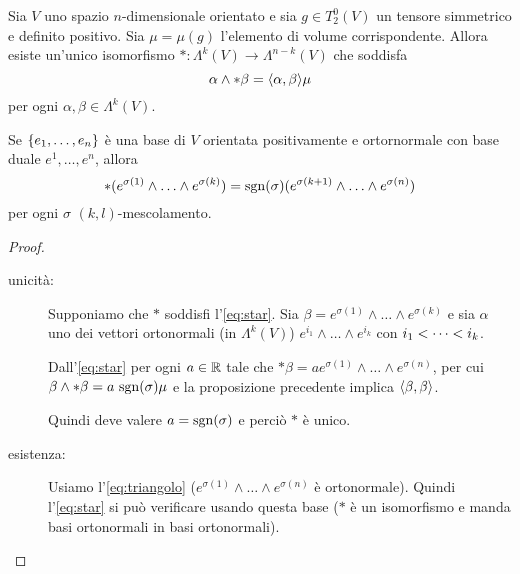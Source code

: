 \begin{proposition}
	Sia $V$ uno spazio $n$-dimensionale orientato e sia $g\in T^0_2(V)$ un tensore simmetrico e definito positivo.
	Sia $\mu=\mu(g)$ l'elemento di volume corrispondente.
	Allora esiste un'unico isomorfismo $*:\Lambda^k(V) \to \Lambda^{n-k}(V)$ che soddisfa
	\begin{equation} \label{eq:star}
	\alpha \wedge * \beta = \Scal \alpha\beta \mu
	\end{equation}
	per ogni $\alpha,\beta \in\Lambda^k(V)$.
	
	Se $\{\seqb en, \}$ è una base di $V$ orientata positivamente e ortornormale con base duale $e^1, \dots ,e^n$, allora
	\begin{equation}\label{eq:triangolo}
	*(e^{\sigma(1)}\wedge\ldots\wedge e^{\sigma(k)}) = \sgn(\sigma) (e^{\sigma(k+1)}\wedge\ldots\wedge e^{\sigma(n)})
	\end{equation}
	per ogni $\sigma$ $(k,l)$-mescolamento.
\end{proposition}
\begin{proof}
	\begin{description}
		\item [unicità:] Supponiamo che $*$ soddisfi l'\cref{eq:star}. Sia $\beta = e^{\sigma(1)} \wedge\ldots\wedge e^{\sigma(k)}$ e sia $\alpha$ uno dei vettori ortonormali (in $\Lambda^k(V)$) $e^{i_1}\wedge\ldots\wedge e^{i_k}$ con $\seqb ik<$.
		
		Dall'\cref{eq:star} per ogni $a\in\R$ tale che $*\beta = a e^{\sigma(1)} \wedge\ldots\wedge e^{\sigma(n)}$, per cui $\beta\wedge * \beta = a\ \sgn(\sigma) \mu$ e la proposizione precedente implica $\Scal \beta\beta$. %
		
		Quindi deve valere $a = \sgn(\sigma)$ e perciò $*$ è unico.
		
		\item [esistenza:] Usiamo l'\cref{eq:triangolo} ($e^{\sigma(1)}\wedge\ldots\wedge e^{\sigma(n)}$ è ortonormale). Quindi l'\cref{eq:star} si può verificare usando questa base ($*$ è un isomorfismo e manda basi ortonormali in basi ortonormali).
	\end{description}
\end{proof}

